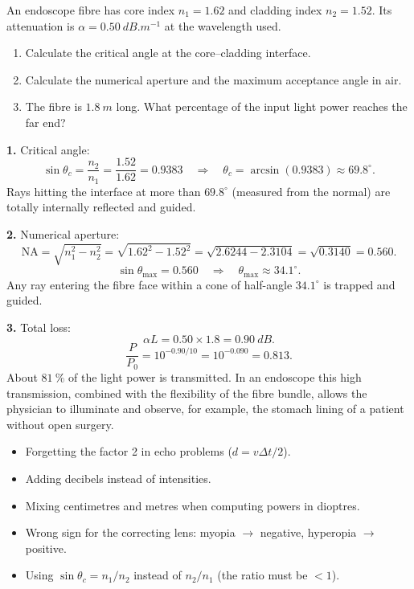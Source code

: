 \documentclass[11pt]{article}
\providecommand{\degree}{^{\circ}}
\begin{document}
\begin{exoresolu}
An endoscope fibre has core index $n_1=1.62$ and cladding index $n_2=1.52$. Its attenuation is $\alpha=\SI{0.50}{dB.m^{-1}}$ at the wavelength used.
\begin{enumerate}
\item Calculate the critical angle at the core--cladding interface.
\item Calculate the numerical aperture and the maximum acceptance angle in air.
\item The fibre is $\SI{1.8}{m}$ long. What percentage of the input light power reaches the far end?
\end{enumerate}
\tcblower
\textbf{1.} Critical angle:
\[
\sin\theta_c=\frac{n_2}{n_1}=\frac{1.52}{1.62}=0.9383\quad\Longrightarrow\quad \theta_c=\arcsin(0.9383)\approx\boxed{69.8\degree}.
\]
Rays hitting the interface at more than $69.8\degree$ (measured from the normal) are totally internally reflected and guided.

\textbf{2.} Numerical aperture:
\[
\mathrm{NA}=\sqrt{n_1^2-n_2^2}=\sqrt{1.62^2-1.52^2}=\sqrt{2.6244-2.3104}=\sqrt{0.3140}=0.560.
\]
\[
\sin\theta_{\max}=0.560\quad\Longrightarrow\quad \theta_{\max}\approx\boxed{34.1\degree}.
\]
Any ray entering the fibre face within a cone of half-angle $34.1\degree$ is trapped and guided.

\textbf{3.} Total loss:
\[
\alpha L=0.50\times1.8=\SI{0.90}{dB}.
\]
\[
\frac{P}{P_0}=10^{-0.90/10}=10^{-0.090}=0.813.
\]
About $\boxed{81\ \%}$ of the light power is transmitted. In an endoscope this high transmission, combined with the flexibility of the fibre bundle, allows the physician to illuminate and observe, for example, the stomach lining of a patient without open surgery.
\end{exoresolu}

\begin{attention}
\begin{itemize}
\item Forgetting the factor 2 in echo problems ($d=v\Delta t/2$).
\item Adding decibels instead of intensities.
\item Mixing centimetres and metres when computing powers in dioptres.
\item Wrong sign for the correcting lens: myopia $\to$ negative, hyperopia $\to$ positive.
\item Using $\sin\theta_c=n_1/n_2$ instead of $n_2/n_1$ (the ratio must be $<1$).
\end{itemize}
\end{attention}
\end{document}

